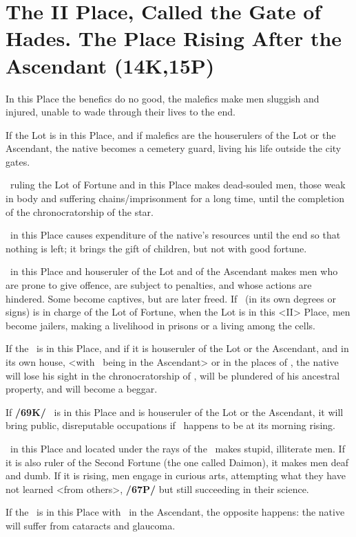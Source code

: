 \section{The II Place, Called the Gate of Hades. The Place Rising After the Ascendant (14K,15P)}
In this Place the benefics do no good, the malefics make men sluggish and injured, unable to wade through their lives to the end. 

If the Lot is in this Place, and if malefics are the houserulers of the Lot or the Ascendant, the native becomes a cemetery guard, living his life outside the city gates. 

\Saturn\, ruling the Lot of Fortune and in this Place makes dead-souled men, those weak in body and suffering
chains/imprisonment for a long time, until the completion of the chronocratorship of the star. 

\Jupiter\, in this Place causes expenditure of the native’s resources until the end so that nothing is left; it brings the gift of children, but not with good fortune. 

\Mars\, in this Place and houseruler of the Lot and of the Ascendant makes men who are prone to give offence, are subject to penalties, and whose actions are hindered. Some become captives, but are later freed. If \Mars\, (in its own degrees or signs) is in charge of the Lot of Fortune, when the Lot is in this <II> Place, men become jailers, making a livelihood in prisons or a living among the cells. 

If the \Sun\, is in this Place, and if it is houseruler of the Lot or the Ascendant, and in its own house, <with \Mars\, being in the Ascendant> or in the places of \Saturn, the native will lose his sight in the chronocratorship of \Mars, will be plundered of his ancestral property, and will become a beggar. 

If \textbf{/69K/} \Venus\, is in this Place and is houseruler of the Lot or the Ascendant, it will bring public, disreputable occupations if \Venus\, happens to be at its morning rising. 

\Mercury\, in this Place and located under the rays of the \Sun\, makes stupid, illiterate men. If it is also ruler of the Second Fortune (the one called Daimon), it makes men deaf and dumb. If it is rising, men engage in curious arts, attempting what they have not learned <from others>, \textbf{/67P/} but still succeeding in their science. 

If the \Moon\, is in this Place with \Saturn\, in the Ascendant, the opposite happens: the native will suffer from cataracts and glaucoma.

\newpage